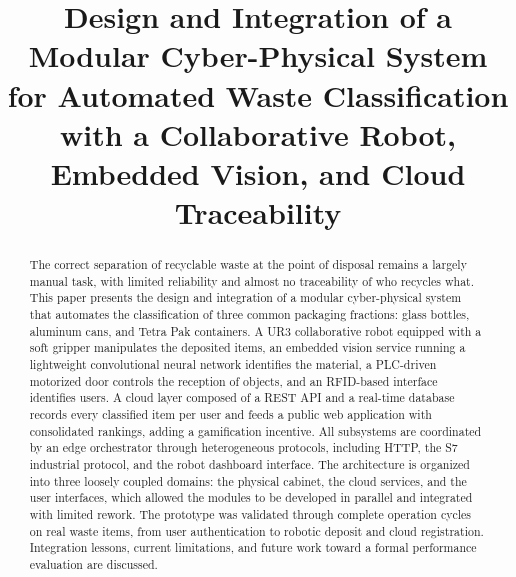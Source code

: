 \documentclass[conference]{IEEEtran}
\begin{document}
\title{Design and Integration of a Modular Cyber-Physical System for Automated Waste Classification with a Collaborative Robot, Embedded Vision, and Cloud Traceability}

\author{
}

\maketitle

\begin{abstract}
The correct separation of recyclable waste at the point of disposal remains a largely manual task, with limited reliability and almost no traceability of who recycles what. This paper presents the design and integration of a modular cyber-physical system that automates the classification of three common packaging fractions: glass bottles, aluminum cans, and Tetra Pak containers. A UR3 collaborative robot equipped with a soft gripper manipulates the deposited items, an embedded vision service running a lightweight convolutional neural network identifies the material, a PLC-driven motorized door controls the reception of objects, and an RFID-based interface identifies users. A cloud layer composed of a REST API and a real-time database records every classified item per user and feeds a public web application with consolidated rankings, adding a gamification incentive. All subsystems are coordinated by an edge orchestrator through heterogeneous protocols, including HTTP, the S7 industrial protocol, and the robot dashboard interface. The architecture is organized into three loosely coupled domains: the physical cabinet, the cloud services, and the user interfaces, which allowed the modules to be developed in parallel and integrated with limited rework. The prototype was validated through complete operation cycles on real waste items, from user authentication to robotic deposit and cloud registration. Integration lessons, current limitations, and future work toward a formal performance evaluation are discussed.
\end{abstract}
\end{document}
